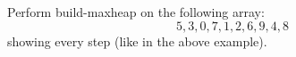 Perform build-maxheap on the following array:
\[
5,3,0,7,1,2,6,9,4,8
\]
showing every step (like in the above example).
